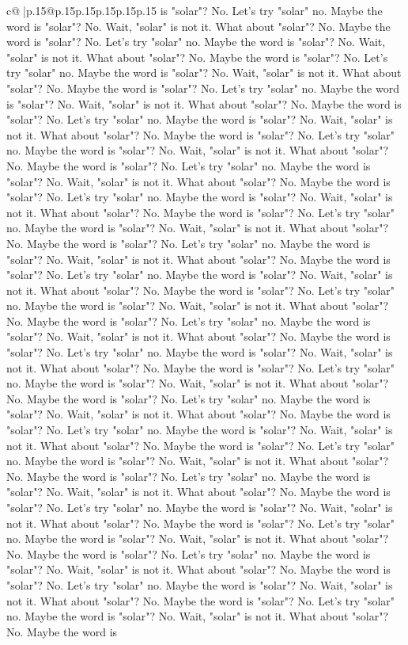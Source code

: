 \documentclass{article}
\begin{document}
{\begin{supertabular}{c@{$\;$}|p{.15\linewidth}@{}p{.15\linewidth}p{.15\linewidth}p{.15\linewidth}p{.15\linewidth}p{.15\linewidth}}
{{{is "solar"? No. Let's try "solar" no. Maybe the word is "solar"? No. Wait, "solar" is not it. What about "solar"? No. Maybe the word is "solar"? No. Let's try "solar" no. Maybe the word is "solar"? No. Wait, "solar" is not it. What about "solar"? No. Maybe the word is "solar"? No. Let's try "solar" no. Maybe the word is "solar"? No. Wait, "solar" is not it. What about "solar"? No. Maybe the word is "solar"? No. Let's try "solar" no. Maybe the word is "solar"? No. Wait, "solar" is not it. What about "solar"? No. Maybe the word is "solar"? No. Let's try "solar" no. Maybe the word is "solar"? No. Wait, "solar" is not it. What about "solar"? No. Maybe the word is "solar"? No. Let's try "solar" no. Maybe the word is "solar"? No. Wait, "solar" is not it. What about "solar"? No. Maybe the word is "solar"? No. Let's try "solar" no. Maybe the word is "solar"? No. Wait, "solar" is not it. What about "solar"? No. Maybe the word is "solar"? No. Let's try "solar" no. Maybe the word is "solar"? No. Wait, "solar" is not it. What about "solar"? No. Maybe the word is "solar"? No. Let's try "solar" no. Maybe the word is "solar"? No. Wait, "solar" is not it. What about "solar"? No. Maybe the word is "solar"? No. Let's try "solar" no. Maybe the word is "solar"? No. Wait, "solar" is not it. What about "solar"? No. Maybe the word is "solar"? No. Let's try "solar" no. Maybe the word is "solar"? No. Wait, "solar" is not it. What about "solar"? No. Maybe the word is "solar"? No. Let's try "solar" no. Maybe the word is "solar"? No. Wait, "solar" is not it. What about "solar"? No. Maybe the word is "solar"? No. Let's try "solar" no. Maybe the word is "solar"? No. Wait, "solar" is not it. What about "solar"? No. Maybe the word is "solar"? No. Let's try "solar" no. Maybe the word is "solar"? No. Wait, "solar" is not it. What about "solar"? No. Maybe the word is "solar"? No. Let's try "solar" no. Maybe the word is "solar"? No. Wait, "solar" is not it. What about "solar"? No. Maybe the word is "solar"? No. Let's try "solar" no. Maybe the word is "solar"? No. Wait, "solar" is not it. What about "solar"? No. Maybe the word is "solar"? No. Let's try "solar" no. Maybe the word is "solar"? No. Wait, "solar" is not it. What about "solar"? No. Maybe the word is "solar"? No. Let's try "solar" no. Maybe the word is "solar"? No. Wait, "solar" is not it. What about "solar"? No. Maybe the word is "solar"? No. Let's try "solar" no. Maybe the word is "solar"? No. Wait, "solar" is not it. What about "solar"? No. Maybe the word is "solar"? No. Let's try "solar" no. Maybe the word is "solar"? No. Wait, "solar" is not it. What about "solar"? No. Maybe the word is "solar"? No. Let's try "solar" no. Maybe the word is "solar"? No. Wait, "solar" is not it. What about "solar"? No. Maybe the word is "solar"? No. Let's try "solar" no. Maybe the word is "solar"? No. Wait, "solar" is not it. What about "solar"? No. Maybe the word is "solar"? No. Let's try "solar" no. Maybe the word is "solar"? No. Wait, "solar" is not it. What about "solar"? No. Maybe the word is "solar"? No. Let's try "solar" no. Maybe the word is "solar"? No. Wait, "solar" is not it. What about "solar"? No. Maybe the word is }}}
\end{supertabular}}
\end{document}
